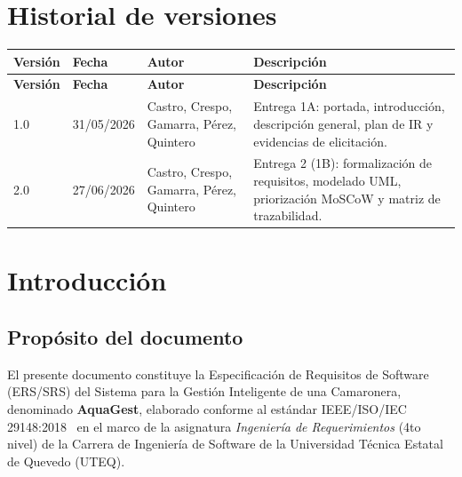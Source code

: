 \documentclass[11pt,a4paper]{article}
\begin{document}
\section*{Historial de versiones}

\begin{longtable}{|p{2cm}|p{2.5cm}|p{4cm}|p{7cm}|}
\hline
\textbf{Versión} & \textbf{Fecha} & \textbf{Autor} & \textbf{Descripción} \\
\hline
\endfirsthead

\hline
\textbf{Versión} & \textbf{Fecha} & \textbf{Autor} & \textbf{Descripción} \\
\hline
\endhead

\hline
\endfoot

\hline
\endlastfoot

1.0 & 31/05/2026 & Castro, Crespo, Gamarra, Pérez, Quintero & Entrega 1A: portada, introducción, descripción general, plan de IR y evidencias de elicitación. \\
\hline

2.0 & 27/06/2026 & Castro, Crespo, Gamarra, Pérez, Quintero & Entrega 2 (1B): formalización de requisitos, modelado UML, priorización MoSCoW y matriz de trazabilidad. \\
\hline

\end{longtable}

\newpage
\tableofcontents
\listoffigures
\listoftables

\newpage

\section{Introducción}

\subsection{Propósito del documento}
El presente documento constituye la Especificación de Requisitos de Software (ERS/SRS) del Sistema para la Gestión Inteligente de una Camaronera, denominado \textbf{AquaGest}, elaborado conforme al estándar IEEE/ISO/IEC 29148:2018~\cite{ieee29148_2018,requirements_ieee_2021} en el marco de la asignatura \textit{Ingeniería de Requerimientos} (4to nivel) de la Carrera de Ingeniería de Software de la Universidad Técnica Estatal de Quevedo (UTEQ).
\end{document}
